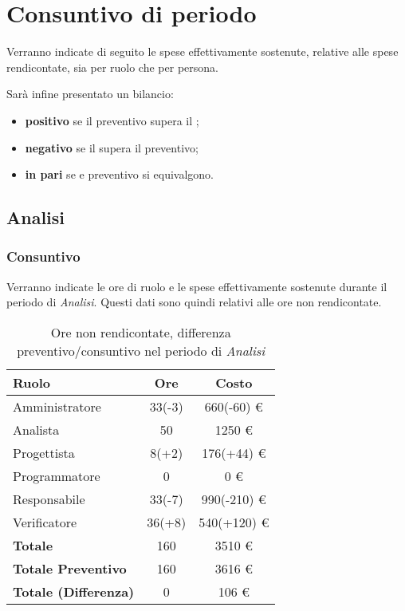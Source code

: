 \section{Consuntivo di periodo}
Verranno indicate di seguito le spese effettivamente sostenute, relative alle spese rendicontate, sia per ruolo che per persona.

Sar\`a infine presentato un bilancio:
\begin{itemize}
\item \textbf{positivo} se il preventivo supera il ;
\item \textbf{negativo} se il  supera il preventivo;
\item \textbf{in pari} se  e preventivo si equivalgono.
\end{itemize}


\subsection{Analisi}
\subsubsection{Consuntivo}
Verranno indicate le ore di ruolo e le spese effettivamente sostenute durante il periodo di \textit{Analisi}. Questi dati sono quindi relativi alle ore non rendicontate.

\begin{table}[H]
	\centering
	\begin{tabular}{ l c c }
		\textbf{Ruolo} & \textbf{Ore} & \textbf{Costo} \\
		\hline
		Amministratore & 33(-3) & 660(-60) \euro{} \\
		Analista & 50 & 1250 \euro{} \\
		Progettista & 8(+2) & 176(+44) \euro{} \\
		Programmatore & 0 & 0 \euro{} \\
		Responsabile & 33(-7) & 990(-210) \euro{} \\
		Verificatore & 36(+8) & 540(+120) \euro{} \\
		\hline
		\textbf{Totale \glossaryItem{Consuntivo}} & 160 & 3510 \euro{} \\
		\hline
		\textbf{Totale Preventivo} & 160 & 3616 \euro{} \\
		\hline
		\textbf{Totale (Differenza)} & 0 & 106 \euro{} \\
		\hline
	\end{tabular}
	\caption{Ore non rendicontate, differenza preventivo/consuntivo nel periodo di \textit{Analisi}}
\end{table}



